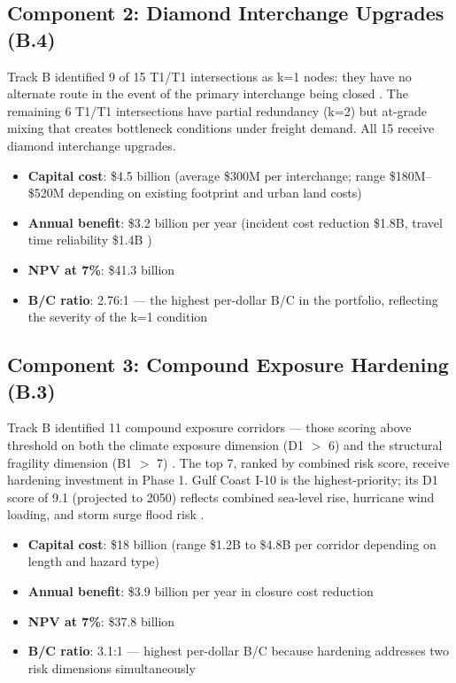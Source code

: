 \subsection{Component 2: Diamond Interchange Upgrades (B.4)}

Track B identified 9 of 15 T1/T1 intersections as k=1 nodes: they have no alternate route in the event of the primary interchange being closed \citep{ROUTE_B4}. The remaining 6 T1/T1 intersections have partial redundancy (k=2) but at-grade mixing that creates bottleneck conditions under freight demand. All 15 receive diamond interchange upgrades.

\begin{itemize}
  \item \textbf{Capital cost}: \$4.5 billion (average \$300M per interchange; range \$180M--\$520M depending on existing footprint and urban land costs)
  \item \textbf{Annual benefit}: \$3.2 billion per year (incident cost reduction \$1.8B, travel time reliability \$1.4B \citep{ROUTE_B4})
  \item \textbf{NPV at 7\%}: \$41.3 billion
  \item \textbf{B/C ratio}: 2.76:1 --- the highest per-dollar B/C in the portfolio, reflecting the severity of the k=1 condition
\end{itemize}

\subsection{Component 3: Compound Exposure Hardening (B.3)}

Track B identified 11 compound exposure corridors --- those scoring above threshold on both the climate exposure dimension (D1 $>$ 6) and the structural fragility dimension (B1 $>$ 7) \citep{ROUTE_B3}. The top 7, ranked by combined risk score, receive hardening investment in Phase 1. Gulf Coast I-10 is the highest-priority; its D1 score of 9.1 (projected to 2050) reflects combined sea-level rise, hurricane wind loading, and storm surge flood risk \citep{ROUTE_D1}.

\begin{itemize}
  \item \textbf{Capital cost}: \$18 billion (range \$1.2B to \$4.8B per corridor depending on length and hazard type)
  \item \textbf{Annual benefit}: \$3.9 billion per year in closure cost reduction \citep{ROUTE_D2}
  \item \textbf{NPV at 7\%}: \$37.8 billion
  \item \textbf{B/C ratio}: 3.1:1 --- highest per-dollar B/C because hardening addresses two risk dimensions simultaneously
\end{itemize}

